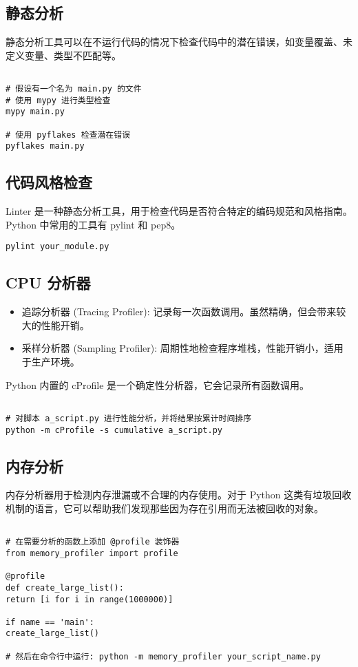 \documentclass[UTF8]{gyh}
\begin{document}
\subsection{静态分析}
静态分析工具可以在不运行代码的情况下检查代码中的潜在错误，如变量覆盖、未定义变量、类型不匹配等。

\begin{lstlisting}

# 假设有一个名为 main.py 的文件
# 使用 mypy 进行类型检查
mypy main.py

# 使用 pyflakes 检查潜在错误
pyflakes main.py
\end{lstlisting}

\subsection{代码风格检查}
Linter 是一种静态分析工具，用于检查代码是否符合特定的编码规范和风格指南。Python 中常用的工具有 pylint 和 pep8。

\begin{lstlisting}
pylint your_module.py
\end{lstlisting}

\subsection{CPU 分析器}
\begin{itemize}
\item 追踪分析器 (Tracing Profiler): 记录每一次函数调用。虽然精确，但会带来较大的性能开销。
\item 采样分析器 (Sampling Profiler): 周期性地检查程序堆栈，性能开销小，适用于生产环境。
\end{itemize}
Python 内置的 cProfile 是一个确定性分析器，它会记录所有函数调用。

\begin{lstlisting}

# 对脚本 a_script.py 进行性能分析，并将结果按累计时间排序
python -m cProfile -s cumulative a_script.py
\end{lstlisting}

\subsection{内存分析}
内存分析器用于检测内存泄漏或不合理的内存使用。对于 Python 这类有垃圾回收机制的语言，它可以帮助我们发现那些因为存在引用而无法被回收的对象。

\begin{lstlisting}

# 在需要分析的函数上添加 @profile 装饰器
from memory_profiler import profile

@profile
def create_large_list():
return [i for i in range(1000000)]

if name == 'main':
create_large_list()

# 然后在命令行中运行: python -m memory_profiler your_script_name.py
\end{lstlisting}
\end{document}
